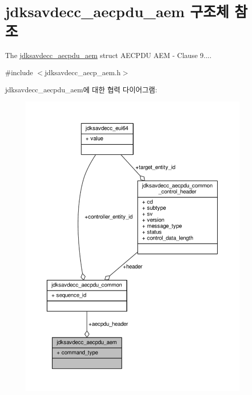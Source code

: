 \hypertarget{structjdksavdecc__aecpdu__aem}{}\section{jdksavdecc\+\_\+aecpdu\+\_\+aem 구조체 참조}
\label{structjdksavdecc__aecpdu__aem}


The \hyperlink{structjdksavdecc__aecpdu__aem}{jdksavdecc\+\_\+aecpdu\+\_\+aem} struct A\+E\+C\+P\+DU A\+EM -\/ Clause 9....  




{\ttfamily \#include $<$jdksavdecc\+\_\+aecp\+\_\+aem.\+h$>$}



jdksavdecc\+\_\+aecpdu\+\_\+aem에 대한 협력 다이어그램\+:
\nopagebreak
\begin{figure}[H]
\begin{center}
\leavevmode
\includegraphics[width=350pt]{structjdksavdecc__aecpdu__aem__coll__graph}
\end{center}
\end{figure}
